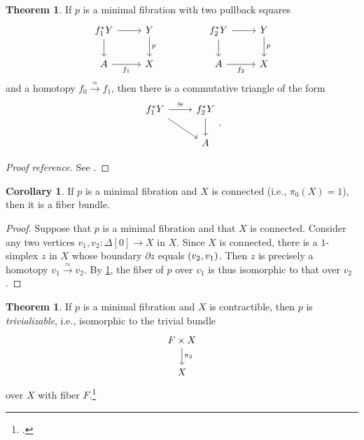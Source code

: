 \documentclass[10pt,letterpaper,cm]{nupset}
\theoremstyle{definition}
\theoremstyle{theorem}
\newtheorem{theorem}[definition]{Theorem}
\newtheorem{corollary}[definition]{Corollary}
\theoremstyle{remark}
\newcommand{\0}{\mathbf{0}}
\newcommand{\1}{\mathbf{1}}
\newcommand{\2}{\mathbf{2}}
\begin{document}
\begin{theorem}\label{minisopull}
If $p$ is a minimal fibration  with two pullback squares
\[
\begin{tikzcd}
f_1^{\ast}{Y} \arrow[d] \arrow[r] & Y \arrow[d, "p"] &  & f_2^{\ast}{Y} \arrow[d] \arrow[r] & Y \arrow[d, "p"] \\
A \arrow[r, "f_1"']            & X                &  & A \arrow[r, "f_2"']            & X               
\end{tikzcd}
\] and a homotopy $f_0\overset{\simeq}{\longrightarrow} f_1$, then there is a commutative triangle of the form
\[
\begin{tikzcd}
f_1^{\ast}{Y} \arrow[r, "\cong"] \arrow[rd] & f_2^{\ast}{Y} \arrow[d] \\
                                            & A                      
\end{tikzcd}
.
\]
\end{theorem}
\begin{proof}[Proof reference]
See \cite[Corollary 10.7]{goerss}.
\end{proof}

\begin{corollary}
If $p$ is a minimal fibration and $X$ is connected (i.e., $\pi_0(X)=1$),  then it is a fiber bundle.
\end{corollary}
\begin{proof}
Suppose that $p$ is a minimal fibration and that $X$ is connected. Consider any two vertices $v_1, v_2 : \Delta[0] \to X$ in $X$. Since $X$ is connected, there is a $1$-simplex $z$ in $X$ whose boundary $\partial{z}$ equals $\mleft(v_2,v_1\mright)$. Then $z$ is precisely a homotopy $v_1 \overset{\simeq}{\longrightarrow} v_2.$ By \cref{minisopull}, the fiber of $p$ over $v_1$ is thus isomorphic to that over $v_2$.
\end{proof}

\begin{theorem}\label{trivifibbund}
If $p$ is a minimal fibration and $X$ is contractible, then $p$ is \textit{trivializable}, i.e., isomorphic to the trivial bundle 
\[
\begin{tikzcd}
F\times X \arrow[d, "\pi_2"] \\
X                           
\end{tikzcd}
\] over $X$ with fiber $F$.\footnote{\cite[Corollary III.5.6]{Barr}.}
\end{theorem}
\end{document}
